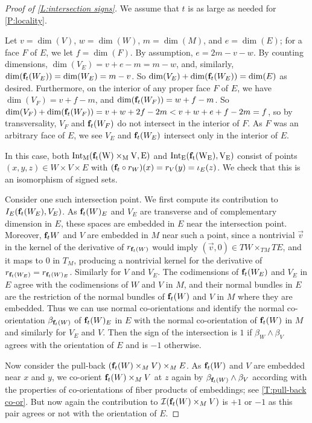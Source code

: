\begin{proof}[Proof of \cref{L:intersection signs}]
	We assume that $t$ is as large as needed for \cref{P:locality}.

	Let $v = \dim(V)$, $w = \dim(W)$, $m = \dim(M)$, and $e = \dim(E)$; for a face $F$ of $E$, we let $f = \dim(F)$.
	By assumption, $e = 2m - v - w$.
	By counting dimensions, $\dim(V_E) = v + e - m = m - w$, and, similarly, $\dim(\mathbf{f}_t(W_E)) = \dim(W_E) = m - v$.
	So $\dim(V_E) + \dim(\mathbf{f}_t(W_E)) = \dim(E)$ as desired.
	Furthermore, on the interior of any proper face $F$ of $E$, we have $\dim(V_F) = v + f - m$, and $\dim(\mathbf{f}_t(W_F)) = w + f -m$.
	So $\dim(V_F) + \dim(\mathbf{f}_t(W_F)) = v + w +2f - 2m < v + w + e +f - 2m = f$, so by transversality, $V_F$ and $\mathbf{f}_t(W_F)$ do not intersect in the interior of $F$.
	As $F$ was an arbitrary face of $E$, we see $V_E$ and $\mathbf{f}_t(W_E)$ intersect only in the interior of $E$.

	In this case, both $\rm{Int}_M(\mathbf{f}_t(W) \times_M V, E)$ and $\rm{Int}_E(\mathbf{f}_t(W_E), V_E)$ consist of points $(x,y,z) \in W \times V \times E$ with $(\mathbf{f}_t \circ r_W)(x) = r_V (y) = \iota_E(z)$.
	We check that this is an isomorphism of signed sets.

	Consider one such intersection point.
	We first compute its contribution to $I_E(\mathbf{f}_t(W_E), V_E)$.
	As $\mathbf{f}_t(W)_E$ and $V_E$ are transverse and of complementary dimension in $E$, these spaces are embedded in $E$ near the intersection point.
	Moreover, $\mathbf{f}_t W$ and $V$ are embedded in $M$ near such a point, since a nontrivial $\vec v$ in the kernel of the derivative of $r_{\mathbf{f}_t (W)}$ would imply $(\vec v,0)\in TW\times_{TM} TE$, and it maps to $0$ in $T_M$, producing a nontrivial kernel for the derivative of $r_{\mathbf{f}_t(W_E)}=r_{\mathbf{f}_t(W)_E}$.
	Similarly for $V$ and $V_E$.
	The codimensions of $\mathbf{f}_t (W_E)$ and $V_E$ in $E$ agree with the codimensions of $W$ and $V$ in $M$, and their normal bundles in $E$ are the restriction of the normal bundles of $\mathbf{f}_t(W)$ and $V$ in $M$ where they are embedded.
	Thus we can use normal co-orientations and identify the normal co-orientation $\beta_{\mathbf{f}_t(W)}$ of $\mathbf{f}_t(W)_E$ in $E$ with the normal co-orientation of $\mathbf{f}_t(W)$ in $M$ and similarly for $V_E$ and $V$.
	Then the sign of the intersection is $1$ if $\beta_W \wedge \beta_V$ agrees with the orientation of $E$ and is $-1$ otherwise.

	Now consider the pull-back $(\mathbf{f}_t(W) \times_M V)\times_M E$.
	As $\mathbf{f}_t( W)$ and $V$ are embedded near $x$ and $y$, we co-orient $\mathbf{f}_t(W) \times_M V$ at $z$ again by $\beta_{\mathbf{f}_t(W)} \wedge \beta_V$ according with the properties of co-orientations of fiber products of embeddings; see \cref{T:pull-back co-or}.
	But now again the contribution to $\mathcal{I}(\mathbf{f}_t(W) \times_M V)$ is $+1$ or $-1$ as this pair agrees or not with the orientation of $E$.
\end{proof}


